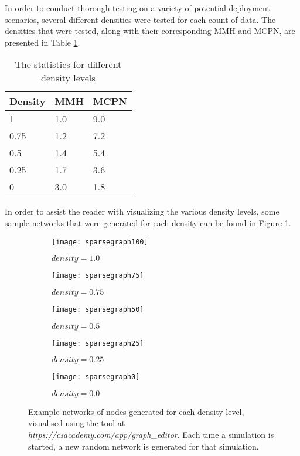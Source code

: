 In order to conduct thorough testing on a variety of potential deployment scenarios, several different densities were tested for each count of data. The densities that were tested, along with their corresponding MMH and MCPN, are presented in Table \ref{sparsedensities}.

\begin{table}[H]
	\centering
	\begin{tabular}{l|l|l}
		Density & MMH & MCPN \\ \hline
		1 & 1.0 & 9.0 \\
		0.75    & 1.2 & 7.2  \\
		0.5    & 1.4 & 5.4  \\
		0.25    & 1.7 & 3.6  \\
		0    & 3.0 & 1.8  \\
	\end{tabular}
	\caption{The statistics for different density levels} \label{sparsedensities}
\end{table}

In order to assist the reader with visualizing the various density levels, some sample networks that were generated for each density can be found in Figure \ref{densefig}.

\begin{figure}[H]
	\centering
	\begin{subfigure}[b]{0.3\textwidth}
		\centering
		\texttt{[image: sparsegraph100]}
		\caption{$density=1.0$}
	\end{subfigure}
	\begin{subfigure}[b]{0.3\textwidth}
		\centering
		\texttt{[image: sparsegraph75]}
		\caption{$density=0.75$}
	\end{subfigure}
	\begin{subfigure}[b]{0.3\textwidth}
		\centering
		\texttt{[image: sparsegraph50]}
		\caption{$density=0.5$}
	\end{subfigure}
	\begin{subfigure}[b]{0.3\textwidth}
		\centering
		\texttt{[image: sparsegraph25]}
		\caption{$density=0.25$}
	\end{subfigure}
	\begin{subfigure}[b]{0.3\textwidth}
		\centering
		\texttt{[image: sparsegraph0]}
		\caption{$density=0.0$}
	\end{subfigure}
	\caption{Example networks of nodes generated for each density level, visualised using the tool at \emph{https://csacademy.com/app/graph\_editor}. Each time a simulation is started, a new random network is generated for that simulation. \label{densefig}}
{}\end{figure}


